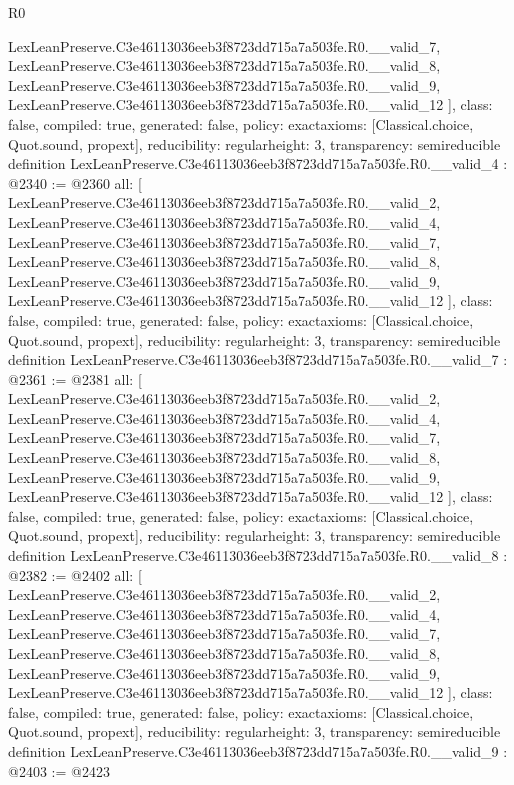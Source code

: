 \begin{lexlean}{R0}
\begin{coremodule}
{    LexLeanPreserve.C3e46113036eeb3f8723dd715a7a503fe.R0.__valid_7,
    LexLeanPreserve.C3e46113036eeb3f8723dd715a7a503fe.R0.__valid_8,
    LexLeanPreserve.C3e46113036eeb3f8723dd715a7a503fe.R0.__valid_9,
    LexLeanPreserve.C3e46113036eeb3f8723dd715a7a503fe.R0.__valid_12
  ],
  class: false,
  compiled: true,
  generated: false,
  policy: exact{axioms: [Classical.choice, Quot.sound, propext]},
  reducibility: regular{height: 3},
  transparency: semireducible
}
definition LexLeanPreserve.C3e46113036eeb3f8723dd715a7a503fe.R0.__valid_4 : @2340 := @2360 {
  all: [
    LexLeanPreserve.C3e46113036eeb3f8723dd715a7a503fe.R0.__valid_2,
    LexLeanPreserve.C3e46113036eeb3f8723dd715a7a503fe.R0.__valid_4,
    LexLeanPreserve.C3e46113036eeb3f8723dd715a7a503fe.R0.__valid_7,
    LexLeanPreserve.C3e46113036eeb3f8723dd715a7a503fe.R0.__valid_8,
    LexLeanPreserve.C3e46113036eeb3f8723dd715a7a503fe.R0.__valid_9,
    LexLeanPreserve.C3e46113036eeb3f8723dd715a7a503fe.R0.__valid_12
  ],
  class: false,
  compiled: true,
  generated: false,
  policy: exact{axioms: [Classical.choice, Quot.sound, propext]},
  reducibility: regular{height: 3},
  transparency: semireducible
}
definition LexLeanPreserve.C3e46113036eeb3f8723dd715a7a503fe.R0.__valid_7 : @2361 := @2381 {
  all: [
    LexLeanPreserve.C3e46113036eeb3f8723dd715a7a503fe.R0.__valid_2,
    LexLeanPreserve.C3e46113036eeb3f8723dd715a7a503fe.R0.__valid_4,
    LexLeanPreserve.C3e46113036eeb3f8723dd715a7a503fe.R0.__valid_7,
    LexLeanPreserve.C3e46113036eeb3f8723dd715a7a503fe.R0.__valid_8,
    LexLeanPreserve.C3e46113036eeb3f8723dd715a7a503fe.R0.__valid_9,
    LexLeanPreserve.C3e46113036eeb3f8723dd715a7a503fe.R0.__valid_12
  ],
  class: false,
  compiled: true,
  generated: false,
  policy: exact{axioms: [Classical.choice, Quot.sound, propext]},
  reducibility: regular{height: 3},
  transparency: semireducible
}
definition LexLeanPreserve.C3e46113036eeb3f8723dd715a7a503fe.R0.__valid_8 : @2382 := @2402 {
  all: [
    LexLeanPreserve.C3e46113036eeb3f8723dd715a7a503fe.R0.__valid_2,
    LexLeanPreserve.C3e46113036eeb3f8723dd715a7a503fe.R0.__valid_4,
    LexLeanPreserve.C3e46113036eeb3f8723dd715a7a503fe.R0.__valid_7,
    LexLeanPreserve.C3e46113036eeb3f8723dd715a7a503fe.R0.__valid_8,
    LexLeanPreserve.C3e46113036eeb3f8723dd715a7a503fe.R0.__valid_9,
    LexLeanPreserve.C3e46113036eeb3f8723dd715a7a503fe.R0.__valid_12
  ],
  class: false,
  compiled: true,
  generated: false,
  policy: exact{axioms: [Classical.choice, Quot.sound, propext]},
  reducibility: regular{height: 3},
  transparency: semireducible
}
definition LexLeanPreserve.C3e46113036eeb3f8723dd715a7a503fe.R0.__valid_9 : @2403 := @2423 {
}
\end{coremodule}
\end{lexlean}
